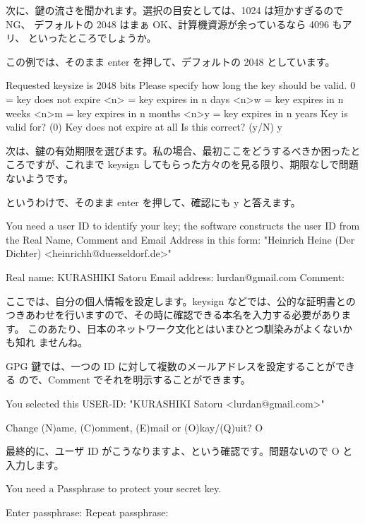 \documentclass[mingoth,a4paper]{jsarticle}
\begin{document}
次に、鍵の流さを聞かれます。選択の目安としては、1024 は短かすぎるので NG、
デフォルトの 2048 はまぁ OK、計算機資源が余っているなら 4096 もアリ、
といったところでしょうか。

この例では、そのまま enter を押して、デフォルトの 2048 としています。

\begin{commandline}
Requested keysize is 2048 bits
Please specify how long the key should be valid.
         0 = key does not expire
      <n>  = key expires in n days
      <n>w = key expires in n weeks
      <n>m = key expires in n months
      <n>y = key expires in n years
Key is valid for? (0) 
Key does not expire at all
Is this correct? (y/N) y
\end{commandline}

次は、鍵の有効期限を選びます。私の場合、最初ここをどうするべきか困ったと
ころですが、これまで keysign してもらった方々のを見る限り、期限なしで問題
ないようです。

というわけで、そのまま enter を押して、確認にも y と答えます。

\begin{commandline}
You need a user ID to identify your key; the software constructs the user ID
from the Real Name, Comment and Email Address in this form:
    "Heinrich Heine (Der Dichter) <heinrichh@duesseldorf.de>"

Real name: KURASHIKI Satoru
Email address: lurdan@gmail.com
Comment: 
\end{commandline}

ここでは、自分の個人情報を設定します。keysign などでは、公的な証明書との
つきあわせを行いますので、その時に確認できる本名を入力する必要があります。
このあたり、日本のネットワーク文化とはいまひとつ馴染みがよくないかも知れ
ませんね。

GPG 鍵では、一つの ID に対して複数のメールアドレスを設定することができる
ので、Comment でそれを明示することができます。

\begin{commandline}
You selected this USER-ID:
    "KURASHIKI Satoru <lurdan@gmail.com>"

Change (N)ame, (C)omment, (E)mail or (O)kay/(Q)uit? O
\end{commandline}

最終的に、ユーザ ID がこうなりますよ、という確認です。問題ないので
O と入力します。

\begin{commandline}
You need a Passphrase to protect your secret key.

Enter passphrase:
Repeat passphrase: 
\end{commandline}
\end{document}
